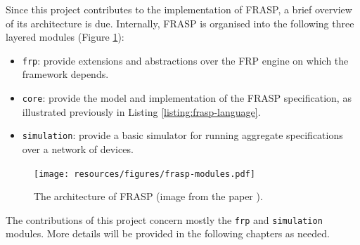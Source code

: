 Since this project contributes to the implementation of FRASP, a brief overview
of its architecture is due. Internally, FRASP is organised into the following
three layered modules (Figure \ref{figure:frasp-modules}):
\begin{itemize}
  \item \texttt{frp}: provide extensions and abstractions over the \ac{FRP}
        engine on which the framework depends.
  \item \texttt{core}: provide the model and implementation of the FRASP
        specification, as illustrated previously in Listing
        \ref{listing:frasp-language}.
  \item \texttt{simulation}: provide a basic simulator for running aggregate
        specifications over a network of devices.
\end{itemize}
\begin{figure}[h]
  \centering
  \texttt{[image: resources/figures/frasp-modules.pdf]}
  \caption{The architecture of FRASP (image from the paper \cite{FRASP}).}
  \label{figure:frasp-modules}
\end{figure}

The contributions of this project concern mostly the \texttt{frp} and
\texttt{simulation} modules. More details will be provided in the following
chapters as needed.
